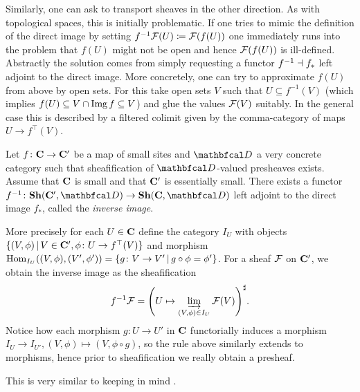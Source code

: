 Similarly, one can ask to transport sheaves in the other direction. As with topological spaces, this is initially problematic. If one tries to mimic the definition of the direct image by setting $f^{-1}{\mathcal{F}}(U) \coloneqq {\mathcal{F}}(f(U))$ one immediately runs into the problem that $f(U)$ might not be open and hence ${\mathcal{F}}(f(U))$ is ill-defined. Abstractly the solution comes from simply requesting a functor $f^{-1} \dashv f_\ast$ left adjoint to the direct image. More concretely, one can try to approximate $f(U)$ from above by open sets. For this take open sets $V$ such that $U\subseteq f^{-1}(V)$ (which implies $f(U)\subseteq V\cap \operatorname{Img} f \subseteq V$) and glue the values ${\mathcal{F}}(V)$ suitably. In the general case this is described by a filtered colimit given by the comma-category of maps $U\to f^\top(V)$.
\begin{proposition}
	\label{Proposition: Existence of inverse image}
	
	Let $f\colon {{\mathbf{C}}}\to {{\mathbf{C}}}'$ be a map of small sites and $\category D$ a very concrete category such that sheafification of $\category D$-valued presheaves exists. Assume that ${{\mathbf{C}}}$ is small and that ${{\mathbf{C}}}'$ is essentially small. There exists a functor $f^{-1}\colon \Sheaves{\site C'}{\category D}\to \Sheaves{\site C}{\category D}$ left adjoint to the direct image $f_\ast$, called the \emph{inverse image}. 
	
	More precisely for each $U \in {{\mathbf{C}}}$ define the category $I_U$ with objects $\{(V, \phi)\,\vert\, V\in{{\mathbf{C}}}', \phi\colon U \to f^\top(V)\}$ and morphism ${\operatorname{Hom}}_{I_U}((V, \phi), (V', \phi')) = \{g\colon V\to V'\,\vert\, g\circ \phi = \phi'\}$. For a sheaf ${\mathcal{F}}$ on ${{\mathbf{C}}}'$, we obtain the inverse image as the sheafification
		$$f^{-1}\sheaf F = \sheafification{U\mapsto \colimit_{(V, \phi) \in I_U} \sheaf F(V)}.$$
	Notice how each morphism $g\colon U\to U'$ in ${{\mathbf{C}}}$ functorially induces a morphism $I_U \to I_{U'}, (V, \phi)\mapsto (V, \phi\circ g)$, so the rule above similarly extends to morphisms, hence prior to sheafification we really obtain a presheaf.
\end{proposition}
\begin{shortproof}
	This is very similar to \cite[Cor. C2.3.4]{elephant2} keeping in mind \cite[Rem. C2.3.7]{elephant2}.
\end{shortproof}

